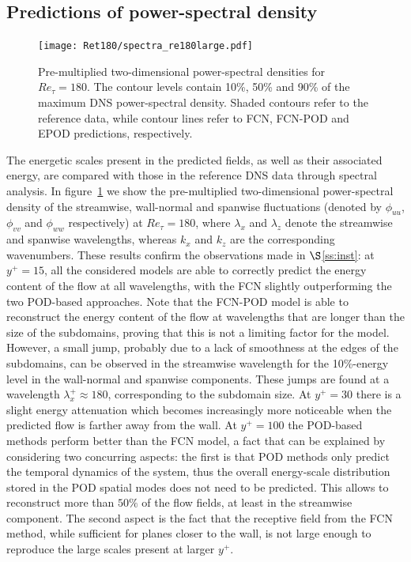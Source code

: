 \subsection{Predictions of power-spectral density}\label{ss:spec}
\begin{figure}
    \centerline{\texttt{[image: Ret180/spectra\_re180large.pdf]}}
    \caption{Pre-multiplied two-dimensional power-spectral densities for $Re_{\tau}=180$. The contour levels contain 10\%, 50\% and 90\% of the maximum DNS power-spectral density. Shaded contours refer to the reference data, while contour lines refer to  FCN,  FCN-POD and  EPOD predictions, respectively.}
    \label{fig:spectra180}
\end{figure}

The energetic scales present in the predicted fields, as well as their associated energy, are compared with those in the reference DNS data through spectral analysis.
In figure~\ref{fig:spectra180} we show the pre-multiplied two-dimensional power-spectral density of the streamwise, wall-normal and spanwise fluctuations (denoted by $\phi_{uu}$, $\phi_{vv}$ and $\phi_{ww}$ respectively) at $Re_{\tau}=180$, where $\lambda_{x}$ and $\lambda_{z}$ denote the streamwise and spanwise wavelengths, whereas $k_{x}$ and $k_{z}$ are the corresponding wavenumbers.
These results confirm the observations made in $\S$\ref{ss:inst}: at $y^+=15$, all the considered models are able to correctly predict the energy content of the flow at all wavelengths, with the FCN slightly outperforming the two POD-based approaches.
Note that the FCN-POD model is able to reconstruct the energy content of the flow at wavelengths that are longer than the size of the subdomains, proving that this is not a limiting factor for the model.
However, a small jump, probably due to a lack of smoothness at the edges of the subdomains, can be observed in the streamwise wavelength for the 10\%-energy level in the wall-normal and spanwise components.
These jumps are found at a wavelength $\lambda_x^+ \approx 180$, corresponding to the subdomain size.
At $y^+=30$ there is a slight energy attenuation which becomes increasingly more noticeable when the predicted flow is farther away from the wall.
At $y^+=100$ the POD-based methods perform better than the FCN model, a fact that can be explained by considering two concurring aspects: the first is that POD methods only predict the temporal dynamics of the system, thus the overall energy-scale distribution stored in the POD spatial modes does not need to be predicted.
This allows to reconstruct more than $50\%$ of the flow fields, at least in the streamwise component.
The second aspect is the fact that the receptive field from the FCN method, while sufficient for planes closer to the wall, is not large enough to reproduce the large scales present at larger $y^{+}$.

